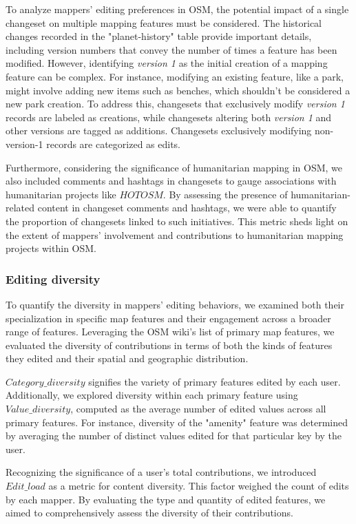 \documentclass[manuscript,screen,review]{acmart}
\begin{document}
To analyze mappers' editing preferences in OSM, the potential impact of a single changeset on multiple mapping features must be considered. The historical changes recorded in the "planet-history" table provide important details, including version numbers that convey the number of times a feature has been modified. However, identifying \textit{version 1} as the initial creation of a mapping feature can be complex. For instance, modifying an existing feature, like a park, might involve adding new items such as benches, which shouldn't be considered a new park creation. To address this, changesets that exclusively modify \textit{version 1} records are labeled as creations, while changesets altering both \textit{version 1} and other versions are tagged as additions. Changesets exclusively modifying non-version-1 records are categorized as edits.  

Furthermore, considering the significance of humanitarian mapping in OSM, we also included comments and hashtags in changesets to gauge associations with humanitarian projects like $HOTOSM$\cite{Hotosm}. By assessing the presence of humanitarian-related content in changeset comments and hashtags, we were able to quantify the proportion of changesets linked to such initiatives. This metric sheds light on the extent of mappers' involvement and contributions to humanitarian mapping projects within OSM.

\subsubsection{Editing diversity}

To quantify the diversity in mappers' editing behaviors, we examined both their specialization in specific map features and their engagement across a broader range of features. Leveraging the OSM wiki's list of primary map features, we evaluated the diversity of contributions in terms of both the kinds of features they edited and their spatial and geographic distribution.

$Category\_diversity$ signifies the variety of primary features edited by each user. Additionally, we explored diversity within each primary feature using $Value\_diversity$, computed as the average number of edited values across all primary features. For instance, diversity of the "amenity" feature was determined by averaging the number of distinct values edited for that particular key by the user.

Recognizing the significance of a user's total contributions, we introduced $Edit\_load$ as a metric for content diversity. This factor weighed the count of edits by each mapper. By evaluating the type and quantity of edited features, we aimed to comprehensively assess the diversity of their contributions.
\end{document}
